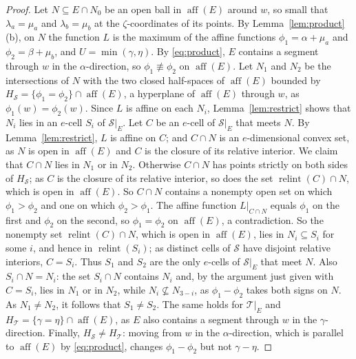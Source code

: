 \documentclass[11pt]{article}
\theoremstyle{definition}
\theoremstyle{remark}
\newcommand{\SSS}{\mathcal S}
\newcommand{\TT}{\mathcal T}
\newcommand{\relint}{\operatorname{relint}}
\newcommand{\aff}{\operatorname{aff}}
\begin{document}
\begin{proof}
Let $N\subseteq E\cap N_0$ be an open ball in $\aff(E)$ around $w$, so small that $\lambda_a=\mu_a$
and $\lambda_b=\mu_b$ at the $\zeta$-coordinates of its points. By
Lemma~\ref{lem:product}(b), on $N$ the function $L$ is the maximum of
the affine functions $\phi_1=\alpha+\mu_a$ and $\phi_2=\beta+\mu_b$, and
$U=\min(\gamma,\eta)$. By \eqref{eq:product}, $E$ contains a segment
through $w$ in the $\alpha$-direction, so $\phi_1\not\equiv\phi_2$ on
$\aff(E)$. Let $N_1$ and $N_2$ be the intersections of $N$ with the two
closed half-spaces of $\aff(E)$ bounded by $H_\SSS=\{\phi_1=\phi_2\}\cap\aff(E)$, a hyperplane of $\aff(E)$ through $w$, as $\phi_1(w)=\phi_2(w)$. Since $L$ is affine on each $N_i$,
Lemma~\ref{lem:restrict} shows that $N_i$ lies in an $e$-cell $S_i$ of $\SSS|_E$. Let $C$ be an $e$-cell of $\SSS|_E$ that meets $N$. By Lemma~\ref{lem:restrict}, $L$ is affine on $C$; and $C\cap N$ is an $e$-dimensional convex set, as $N$ is open in $\aff(E)$ and $C$ is the closure of its relative interior. We claim that
$C\cap N$ lies in $N_1$ or in $N_2$. Otherwise $C\cap N$ has points strictly on both sides of $H_\SSS$; as $C$ is the closure of its relative interior, so does the set $\relint(C)\cap N$, which is open in $\aff(E)$. So $C\cap N$ contains a nonempty open set on which $\phi_1>\phi_2$ and one on which $\phi_2>\phi_1$. The affine function $L|_{C\cap N}$ equals $\phi_1$ on the first and $\phi_2$ on the second, so $\phi_1=\phi_2$ on $\aff(E)$, a contradiction. So the nonempty set $\relint(C)\cap N$, which is open in $\aff(E)$, lies in $N_i\subseteq S_i$ for some $i$, and hence in $\relint(S_i)$; as distinct cells of $\SSS$ have disjoint relative interiors, $C=S_i$. Thus $S_1$ and $S_2$ are the only $e$-cells of $\SSS|_E$
that meet $N$. Also $S_i\cap N=N_i$: the set $S_i\cap N$ contains $N_i$ and, by the argument just given with
$C=S_i$, lies in $N_1$ or in $N_2$, while $N_i\not\subseteq N_{3-i}$, as $\phi_1-\phi_2$ takes both signs on $N$. As $N_1\neq N_2$, it follows that $S_1\neq S_2$. The same holds for $\TT|_E$ and
$H_\TT=\{\gamma=\eta\}\cap\aff(E)$, as $E$ also contains a segment
through $w$ in the $\gamma$-direction. Finally, $H_\SSS\neq H_\TT$: moving from $w$ in the $\alpha$-direction, which is parallel to $\aff(E)$ by \eqref{eq:product}, changes $\phi_1-\phi_2$ but not
$\gamma-\eta$.
\end{proof}
\end{document}
